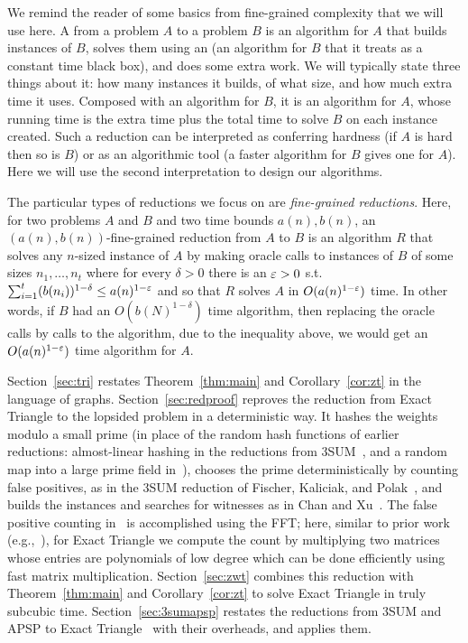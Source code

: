 We remind the reader of some basics from fine-grained complexity that we will use here. 
A  from a problem $A$ to a problem $B$ is an algorithm for $A$ that builds instances of $B$, solves them using an  (an algorithm for $B$ that it treats as a constant time black box), and does some extra work. We will typically state three things about it: how many instances it builds, of what size, and how much extra time it uses. Composed with an algorithm for $B$, it is an algorithm for $A$, whose running time is the extra time plus the total time to solve $B$ on each instance created. Such a reduction can be interpreted as conferring hardness (if $A$ is hard then so is $B$) or as an algorithmic tool (a faster algorithm for $B$ gives one for $A$). Here we will use the second interpretation to design our algorithms.

The particular types of reductions we focus on are {\em fine-grained reductions}. Here, for two problems $A$ and $B$ and two time bounds $a(n),b(n)$, an $(a(n),b(n))$-fine-grained reduction from $A$ to $B$ is an algorithm $R$ that solves any $n$-sized instance of $A$ by making oracle calls to instances of $B$ of some sizes $n_1,\ldots,n_t$ where for every $\delta>0$ there is an $\varepsilon>0$ s.t. $\sum_{i=1}^t (b(n_i))^{1-\delta}\leq a(n)^{1-\varepsilon}$ and so that $R$ solves $A$ in $O(a(n)^{1-\varepsilon})$ time. In other words, if $B$ had an $O(b(N)^{1-\delta})$ time algorithm, then replacing the oracle calls by calls to the algorithm, due to the inequality above, we would get an $O(a(n)^{1-\varepsilon})$ time algorithm for $A$.


Section~\ref{sec:tri} restates Theorem~\ref{thm:main} and Corollary~\ref{cor:zt} in the language of graphs. Section~\ref{sec:redproof} reproves the reduction from Exact Triangle to the lopsided problem in a deterministic way. It hashes the weights modulo a small prime (in place of the random hash functions of earlier reductions: almost-linear hashing in the reductions from $3$SUM~\cite{Pat10,KPP16}, and a random map into a large prime field in~\cite{VX20a}), chooses the prime deterministically by counting false positives, as in the $3$SUM reduction of Fischer, Kaliciak, and Polak~\cite{FKP24}, and builds the instances and searches for witnesses as in Chan and Xu~\cite{CX24}. 
The false positive counting in~\cite{FKP24} is accomplished using the FFT; here, similar to prior work (e.g.,~\cite{AGM97}), for Exact Triangle we compute the count by multiplying two matrices whose entries are polynomials of low degree which can be done efficiently using fast matrix multiplication.
Section~\ref{sec:zwt} combines this reduction with Theorem~\ref{thm:main} and Corollary~\ref{cor:zt} to solve Exact Triangle in truly subcubic time. Section~\ref{sec:3sumapsp} restates the reductions from $3$SUM and APSP to Exact Triangle~\cite{VW13,VW10,VW18,CH20} with their overheads, and applies them.



